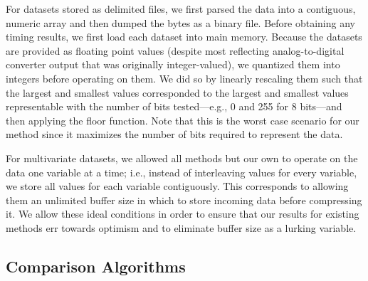 
For datasets stored as delimited files, we first parsed the data into a contiguous, numeric array and then dumped the bytes as a binary file. Before obtaining any timing results, we first load each dataset into main memory.
Because the datasets are provided as floating point values (despite most reflecting analog-to-digital converter output that was originally integer-valued), we quantized them into integers before operating on them. We did so by linearly rescaling them such that the largest and smallest values corresponded to the largest and smallest values representable with the number of bits tested---e.g., 0 and 255 for 8 bits---and then applying the floor function. Note that this is the worst case scenario for our method since it maximizes the number of bits required to represent the data.

For multivariate datasets, we allowed all methods but our own to operate on the data one variable at a time; i.e., instead of interleaving values for every variable, we store all values for each variable contiguously. This corresponds to allowing them an unlimited buffer size in which to store incoming data before compressing it. We allow these ideal conditions in order to ensure that our results for existing methods err towards optimism and to eliminate buffer size as a lurking variable.


\subsection{Comparison Algorithms}

